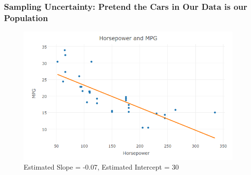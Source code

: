 \documentclass{beamer}
\begin{document}
\begin{frame}
\frametitle{Sampling Uncertainty: Pretend the Cars in Our Data is our Population}

\begin{figure}[h]
\centering
\includegraphics[scale = 0.4]{./images/carsFitted2}
\caption{Estimated Slope = -0.07, Estimated Intercept = 30}
\end{figure}


\end{frame}
\end{document}
